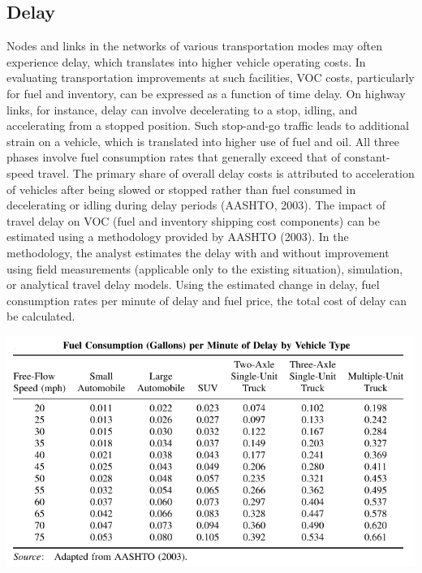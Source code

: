 \subsection{Delay}
Nodes and links in the networks of various transportation modes may often experience delay, which translates into higher vehicle operating costs. In evaluating transportation improvements at such facilities, VOC costs, particularly for fuel and inventory, can be expressed as a function of time delay. On highway links, for instance, delay can involve decelerating to a stop, idling, and accelerating from a stopped position. Such stop-and-go traffic leads to additional strain on a vehicle, which is translated into higher use of fuel and oil. All three phases involve fuel consumption rates that generally exceed that of constant-speed travel. The primary share of overall delay costs is attributed to acceleration of vehicles after being slowed or stopped rather than fuel consumed in decelerating or idling during delay periods (AASHTO, 2003). The impact of travel delay on VOC (fuel and inventory shipping cost components) can be estimated using a methodology provided by AASHTO (2003). In the methodology, the analyst estimates the delay with and without improvement using field measurements (applicable only to the existing situation), simulation, or analytical travel delay models. Using the estimated change in delay, fuel consumption rates per minute of delay and fuel price, the total cost of delay can be calculated.
\begin{center}
	\includegraphics[scale=0.57]{gfx/fig67.png}
\end{center}
%
